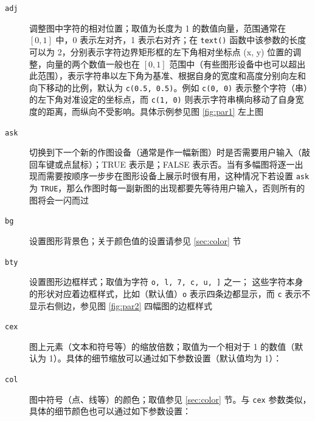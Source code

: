 \documentclass[
  b5paper,
  UTF8,twoside]{book}
\providecommand{\tightlist}{%
  \setlength{\itemsep}{0pt}\setlength{\parskip}{0pt}}
\begin{document}
\begin{description}
\item[\texttt{adj}]
调整图中字符的相对位置；取值为长度为 1 的数值向量，范围通常在 \([0,1]\) 中，0 表示左对齐，1 表示右对齐；在 \texttt{text()} 函数中该参数的长度可以为 2，分别表示字符边界矩形框的左下角相对坐标点 (x, y) 位置的调整，向量的两个数值一般也在 \([0,1]\) 范围中（有些图形设备中也可以超出此范围），表示字符串以左下角为基准、根据自身的宽度和高度分别向左和向下移动的比例，默认为 \texttt{c(0.5,\ 0.5)}。例如 \texttt{c(0,\ 0)} 表示整个字符（串）的左下角对准设定的坐标点，而 \texttt{c(1,\ 0)} 则表示字符串横向移动了自身宽度的距离，而纵向不受影响。具体示例参见图 \ref{fig:par1} 左上图
\item[\texttt{ask}]
切换到下一个新的作图设备（通常是作一幅新图）时是否需要用户输入（敲回车键或点鼠标）；TRUE 表示是；FALSE 表示否。当有多幅图将逐一出现而需要按顺序一步步在图形设备上展示时很有用，这种情况下若设置 \texttt{ask} 为 \texttt{TRUE}，那么作图时每一副新图的出现都要先等待用户输入，否则所有的图将会一闪而过
\item[\texttt{bg}]
设置图形背景色；关于颜色值的设置请参见 \ref{sec:color} 节
\item[\texttt{bty}]
设置图形边框样式；取值为字符 \texttt{o,\ l,\ 7,\ c,\ u,\ {]}} 之一； 这些字符本身的形状对应着边框样式，比如（默认值）\texttt{o} 表示四条边都显示，而 \texttt{c} 表示不显示右侧边，参见图 \ref{fig:par2} 四幅图的边框样式
\item[\texttt{cex}]
图上元素（文本和符号等）的缩放倍数；取值为一个相对于 1 的数值（默认为 1）。具体的细节缩放可以通过如下参数设置（默认值均为 1）：

\item[\texttt{col}]
图中符号（点、线等）的颜色；取值参见 \ref{sec:color} 节。与 \texttt{cex} 参数类似，具体的细节颜色也可以通过如下参数设置：


\end{description}
\end{document}
